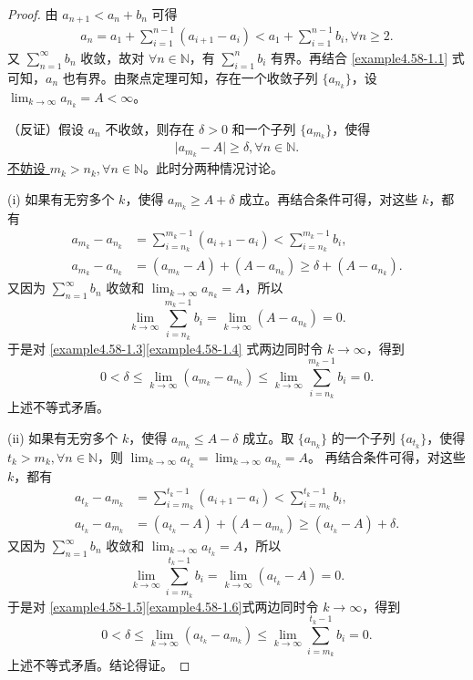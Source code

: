 \documentclass[../../main.tex]{subfiles}%
\begin{document}
\begin{proof}
由 \(a_{n + 1} < a_n + b_n\) 可得
\begin{align}
a_n = a_1 + \sum_{i = 1}^{n - 1} (a_{i + 1} - a_i) < a_1 + \sum_{i = 1}^{n - 1} b_i, \forall n \geqslant 2. \label{example4.58-1.1}
\end{align}
又 \(\sum_{n = 1}^{\infty} b_n\) 收敛，故对 \(\forall n \in \mathbb{N}\)，有 \(\sum_{i = 1}^n b_i\) 有界。再结合 \eqref{example4.58-1.1} 式可知，\(a_n\) 也有界。由聚点定理可知，存在一个收敛子列 \(\{ a_{n_k} \}\)，设 \(\lim_{k \to \infty} a_{n_k} = A < \infty\)。

（反证）假设 \(a_n\) 不收敛，则存在 \(\delta > 0\) 和一个子列 \(\{ a_{m_k} \}\)，使得
\begin{align*}
\vert a_{m_k} - A \vert \geqslant \delta, \forall n \in \mathbb{N}. 
\end{align*}
\hyperlink{example4.58不妨设的原因}{不妨设 \(m_k > n_k, \forall n \in \mathbb{N}\)}。此时分两种情况讨论。

(i) 如果有无穷多个 \(k\)，使得 \(a_{m_k} \geqslant A + \delta\) 成立。再结合条件可得，对这些 \(k\)，都有
\begin{align}
a_{m_k} - a_{n_k} &= \sum_{i = n_k}^{m_k - 1} (a_{i + 1} - a_i) < \sum_{i = n_k}^{m_k - 1} b_i, \label{example4.58-1.3}\\
a_{m_k} - a_{n_k} &= (a_{m_k} - A) + (A - a_{n_k}) \geqslant \delta + (A - a_{n_k}). \label{example4.58-1.4}
\end{align}
又因为 \(\sum_{n = 1}^{\infty} b_n\) 收敛和 \(\lim_{k \to \infty} a_{n_k} = A\)，所以
\[
\lim_{k \to \infty} \sum_{i = n_k}^{m_k - 1} b_i = \lim_{k \to \infty} (A - a_{n_k}) = 0.
\]
于是对 \eqref{example4.58-1.3}\eqref{example4.58-1.4} 式两边同时令 \(k \to \infty\)，得到
\[
0 < \delta \leqslant \lim_{k \to \infty} (a_{m_k} - a_{n_k}) \leqslant \lim_{k \to \infty} \sum_{i = n_k}^{m_k - 1} b_i = 0.
\]
上述不等式矛盾。

(ii) 如果有无穷多个 \(k\)，使得 \(a_{m_k} \leqslant A - \delta\) 成立。取 \(\{ a_{n_k} \}\) 的一个子列 \(\{ a_{t_k} \}\)，使得 \(t_k > m_k, \forall n \in \mathbb{N}\)，则 \(\lim_{k \to \infty} a_{t_k} = \lim_{k \to \infty} a_{n_k} = A\)。
再结合条件可得，对这些 \(k\)，都有
\begin{align}
a_{t_k} - a_{m_k} &= \sum_{i = m_k}^{t_k - 1} (a_{i + 1} - a_i) < \sum_{i = m_k}^{t_k - 1} b_i, \label{example4.58-1.5}\\
a_{t_k} - a_{m_k} &= (a_{t_k} - A) + (A - a_{m_k}) \geqslant (a_{t_k} - A) + \delta. \label{example4.58-1.6}
\end{align}
又因为 \(\sum_{n = 1}^{\infty} b_n\) 收敛和 \(\lim_{k \to \infty} a_{t_k} = A\)，所以
\[
\lim_{k \to \infty} \sum_{i = m_k}^{t_k - 1} b_i = \lim_{k \to \infty} (a_{t_k} - A) = 0.
\]
于是对 \eqref{example4.58-1.5}\eqref{example4.58-1.6}式两边同时令 \(k \to \infty\)，得到
\[
0 < \delta \leqslant \lim_{k \to \infty} (a_{t_k} - a_{m_k}) \leqslant \lim_{k \to \infty} \sum_{i = m_k}^{t_k - 1} b_i = 0.
\]
上述不等式矛盾。结论得证。
\end{proof}
\end{document}
